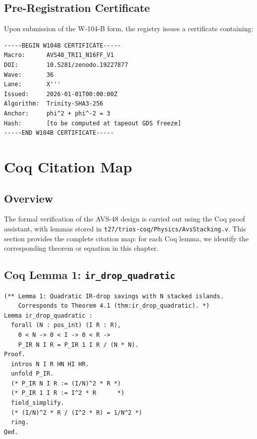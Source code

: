 \subsection{Pre-Registration Certificate}

Upon submission of the W-104-B form, the registry issues a certificate
containing:
\begin{verbatim}
-----BEGIN W104B CERTIFICATE-----
Macro:      AVS48_TRI1_N16FF_V1
DOI:        10.5281/zenodo.19227877
Wave:       36
Lane:       X'''
Issued:     2026-01-01T00:00:00Z
Algorithm:  Trinity-SHA3-256
Anchor:     phi^2 + phi^-2 = 3
Hash:       [to be computed at tapeout GDS freeze]
-----END W104B CERTIFICATE-----
\end{verbatim}

\section{Coq Citation Map}
\label{sec:coq_map}

\subsection{Overview}

The formal verification of the AVS-48 design is carried out using the
Coq proof assistant, with lemmas stored in
\texttt{t27/trios-coq/Physics/AvsStacking.v}.
This section provides the complete citation map: for each Coq lemma,
we identify the corresponding theorem or equation in this chapter.

\subsection{Coq Lemma 1: \texttt{ir\_drop\_quadratic}}

\begin{verbatim}
(** Lemma 1: Quadratic IR-drop savings with N stacked islands.
    Corresponds to Theorem 4.1 (thm:ir_drop_quadratic). *)
Lemma ir_drop_quadratic :
  forall (N : pos_int) (I R : R),
    0 < N -> 0 < I -> 0 < R ->
    P_IR N I R = P_IR 1 I R / (N * N).
Proof.
  intros N I R HN HI HR.
  unfold P_IR.
  (* P_IR N I R := (I/N)^2 * R *)
  (* P_IR 1 I R := I^2 * R      *)
  field_simplify.
  (* (I/N)^2 * R / (I^2 * R) = 1/N^2 *)
  ring.
Qed.
\end{verbatim}

